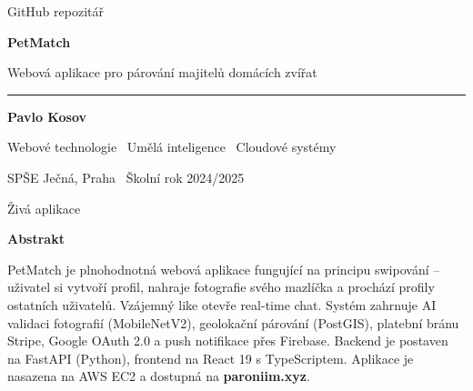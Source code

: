 \documentclass[final]{beamer}
\begin{document}
\begin{frame}[t]

\vspace{0.5em}

\begin{minipage}[c]{0.18\linewidth}
  \centering
  \par
  \vspace{0.4em}
  {\fontsize{28}{34}\selectfont\color{darkGray} GitHub repozitář}
\end{minipage}%
\hfill%
\begin{minipage}[c]{0.60\linewidth}
  \centering
  {\color{jecnaBlue}\bfseries\fontsize{90}{110}\selectfont PetMatch}\par
  \vspace{0.4em}
  {\color{darkGray}\fontsize{44}{56}\selectfont Webová aplikace pro párování majitelů domácích zvířat}\par
  \vspace{0.8em}
  \textcolor{jecnaBlue}{\rule{\linewidth}{4pt}}\par
  \vspace{0.6em}
  {\fontsize{46}{56}\selectfont\bfseries Pavlo Kosov}\par
  \vspace{0.3em}
  {\fontsize{36}{46}\selectfont\color{darkGray} Webové technologie \textbullet\ Umělá inteligence \textbullet\ Cloudové systémy}\par
  \vspace{0.3em}
  {\fontsize{32}{40}\selectfont\color{darkGray} SPŠE Ječná, Praha \textbullet\ Školní rok 2024/2025}\par
\end{minipage}%
\hfill%
\begin{minipage}[c]{0.18\linewidth}
  \centering
  \par
  \vspace{0.4em}
  {\fontsize{28}{34}\selectfont\color{darkGray} Živá aplikace}
\end{minipage}

\vspace{1em}

\begin{abstractbox}
  {\color{jecnaBlue}\bfseries\fontsize{40}{50}\selectfont Abstrakt}\par
  \vspace{0.5em}
  {\fontsize{34}{44}\selectfont
  PetMatch je plnohodnotná webová aplikace fungující na principu swipování – uživatel si vytvoří profil, nahraje fotografie svého mazlíčka a prochází profily ostatních uživatelů. Vzájemný like otevře real-time chat. Systém zahrnuje AI validaci fotografií (MobileNetV2), geolokační párování (PostGIS), platební bránu Stripe, Google OAuth 2.0 a push notifikace přes Firebase. Backend je postaven na FastAPI (Python), frontend na React 19 s TypeScriptem. Aplikace je nasazena na AWS EC2 a dostupná na \textbf{paroniim.xyz}.

}
\end{abstractbox}
\end{frame}
\end{document}
